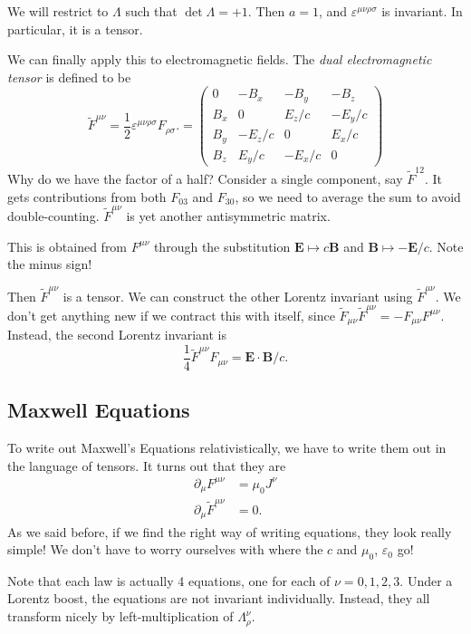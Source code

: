 \documentclass[a4paper]{article}
\begin{document}
We will restrict to $\Lambda$ such that $\det \Lambda = +1$. Then $a = 1$, and $\varepsilon^{\mu\nu\rho\sigma}$ is invariant. In particular, it is a tensor.

We can finally apply this to electromagnetic fields. The \emph{dual electromagnetic tensor} is defined to be
\[
  \tilde{F}^{\mu\nu} = \frac{1}{2}\varepsilon^{\mu\nu\rho\sigma}F_{\rho\sigma}.=
  \begin{pmatrix}
    0 & -B_x & -B_y & -B_z\\
    B_x & 0 & E_z/c & -E_y/c\\
    B_y & -E_z/c & 0 & E_x/c\\
    B_z & E_y/c & -E_x/c & 0
  \end{pmatrix}
\]
Why do we have the factor of a half? Consider a single component, say $\tilde{F}^{12}$. It gets contributions from both $F_{03}$ and $F_{30}$, so we need to average the sum to avoid double-counting. $\tilde{F}^{\mu\nu}$ is yet another antisymmetric matrix.

This is obtained from $F^{\mu\nu}$ through the substitution $\mathbf{E} \mapsto c\mathbf{B}$ and $\mathbf{B}\mapsto -\mathbf{E}/c$. Note the minus sign!

Then $\tilde{F}^{\mu\nu}$ is a tensor. We can construct the other Lorentz invariant using $\tilde{F}^{\mu\nu}$. We don't get anything new if we contract this with itself, since $\tilde{F}_{\mu\nu}\tilde{F}^{\mu\nu} = -F_{\mu\nu}F^{\mu\nu}$. Instead, the second Lorentz invariant is
\[
  \frac{1}{4}\tilde{F}^{\mu\nu}F_{\mu\nu} = \mathbf{E}\cdot \mathbf{B}/c.
\]
\subsection{Maxwell Equations}
To write out Maxwell's Equations relativistically, we have to write them out in the language of tensors. It turns out that they are
\begin{align*}
  \partial_\mu F^{\mu\nu} &= \mu_0 J^\nu\\
  \partial_\mu \tilde{F}^{\mu\nu} &= 0.
\end{align*}
As we said before, if we find the right way of writing equations, they look really simple! We don't have to worry ourselves with where the $c$ and $\mu_0$, $\varepsilon_0$ go!

Note that each law is actually 4 equations, one for each of $\nu = 0, 1, 2, 3$. Under a Lorentz boost, the equations are not invariant individually. Instead, they all transform nicely by left-multiplication of $\Lambda_\rho^\nu$.
\end{document}
